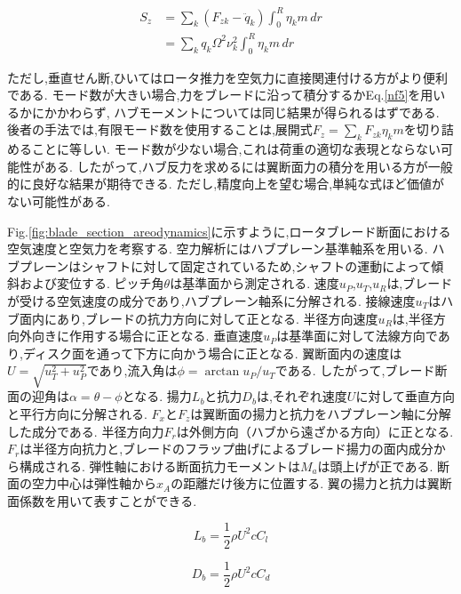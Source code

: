     \begin{align}
    S_z &= \sum_k \left( F_{zk} - \ddot{q}_k \right) \int_0^R \eta_k m \, dr     \\
        &= \sum_k  q_k \Omega^2 {\nu}_k^2  \int_0^R \eta_k m \, dr   \label{sz4}
    \end{align}

    ただし,垂直せん断,ひいてはロータ推力を空気力に直接関連付ける方がより便利である.
    モード数が大きい場合,力をブレードに沿って積分するかEq.\eqref{nf5}を用いるかにかかわらず,
    ハブモーメントについては同じ結果が得られるはずである.
    後者の手法では,有限モード数を使用することは,展開式$F_z = \sum_k F_{zk} \eta_k m$を切り詰めることに等しい.
    モード数が少ない場合,これは荷重の適切な表現とならない可能性がある.
    したがって,ハブ反力を求めるには翼断面力の積分を用いる方が一般的に良好な結果が期待できる.
    ただし,精度向上を望む場合,単純な式ほど価値がない可能性がある.


    Fig.\ref{fig:blade_section_areodynamics}に示すように,ロータブレード断面における空気速度と空気力を考察する.
    空力解析にはハブプレーン基準軸系を用いる.
    ハブプレーンはシャフトに対して固定されているため,シャフトの運動によって傾斜および変位する.
    ピッチ角$\theta$は基準面から測定される.
    速度$u_P$,$u_T$,$u_R$は,ブレードが受ける空気速度の成分であり,ハブプレーン軸系に分解される.
    接線速度$u_T$はハブ面内にあり,ブレードの抗力方向に対して正となる.
    半径方向速度$u_R$は,半径方向外向きに作用する場合に正となる.
    垂直速度$u_P$は基準面に対して法線方向であり,ディスク面を通って下方に向かう場合に正となる.
    翼断面内の速度は$U = \sqrt{u_T^2 + u_P^2}$であり,流入角は$\phi = \arctan{u_P/u_T}$である.
    したがって,ブレード断面の迎角は$\alpha = \theta - \phi$となる.
    揚力$L_b$と抗力$D_b$は,それぞれ速度$U$に対して垂直方向と平行方向に分解される.
    $F_x$と$F_z$は翼断面の揚力と抗力をハブプレーン軸に分解した成分である.
    半径方向力$F_r$は外側方向（ハブから遠ざかる方向）に正となる.
    $F_r$は半径方向抗力と,ブレードのフラップ曲げによるブレード揚力の面内成分から構成される.
    弾性軸における断面抗力モーメントは$M_a$は頭上げが正である.
    断面の空力中心は弾性軸から$x_A$の距離だけ後方に位置する.
    翼の揚力と抗力は翼断面係数を用いて表すことができる.


    \begin{equation}
    L_b = \frac{1}{2} \rho U^2 c C_l   \label{L}
    \end{equation}

    \begin{equation}
    D_b = \frac{1}{2} \rho U^2 c C_d   \label{D}
    \end{equation}


